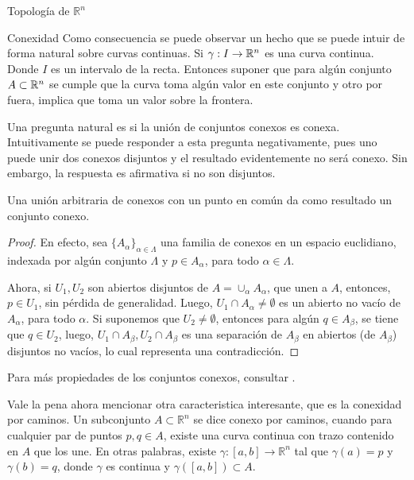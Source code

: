 \begin{chapter}{Topología de $\mathbb{R}^n$}
\begin{section}{Conexidad}
Como consecuencia se puede observar un hecho que se puede intuir de forma natural sobre curvas continuas. Si $\gamma: I \to \mathbb{R}^n$ es una curva continua. Donde $I$ es un intervalo de la recta. Entonces suponer que para algún conjunto $A \subset \mathbb{R}^n$ se cumple que la curva toma algún valor en este conjunto y otro por fuera, implica que toma un valor sobre la frontera.

Una pregunta natural es si la unión de conjuntos conexos es conexa. Intuitivamente se puede responder a esta pregunta negativamente, pues uno puede unir dos conexos disjuntos y el resultado evidentemente no será conexo. Sin embargo, la respuesta es afirmativa si no son disjuntos.

\begin{them}

Una unión arbitraria de conexos con un punto en común da como resultado un conjunto conexo.

\end{them}

\begin{proof}

En efecto, sea $\{ A_{\alpha} \}_{\alpha \in \Lambda}$ una familia de conexos en un espacio euclidiano, indexada por algún conjunto $\Lambda$ y $p \in A_{\alpha}$, para todo $\alpha \in \Lambda$.

Ahora, si $U_1, U_2$ son abiertos disjuntos de $A = \cup_{\alpha} A_{\alpha}$, que unen a $A$, entonces, $p \in U_1$, sin pérdida de generalidad. Luego, $U_1 \cap A_{\alpha} \neq \emptyset$ es un abierto no vacío de $A_{\alpha}$, para todo $\alpha$. Si suponemos que $U_2 \neq \emptyset$, entonces para algún $q \in A_{\beta}$, se tiene que $q \in U_2$, luego, $U_1 \cap A_{\beta}, U_2 \cap A_{\beta}$ es una separación de $A_{\beta}$ en abiertos (de $A_{\beta}$) disjuntos no vacíos, lo cual representa una contradicción.

\end{proof}

Para más propiedades de los conjuntos conexos, consultar \cite{lima2004curso}.

Vale la pena ahora mencionar otra caracteristica interesante, que es la conexidad por caminos. Un subconjunto $A \subset \mathbb{R}^n$ se dice conexo por caminos, cuando para cualquier par de puntos $p, q \in A$, existe una curva continua con trazo contenido en $A$ que los une. En otras palabras, existe $\gamma: [a,b] \to \mathbb{R}^n$ tal que $\gamma(a) = p$ y $\gamma(b) = q$, donde $\gamma$ es continua y $\gamma([a,b])\subset A$.


\end{section}
\end{chapter}
